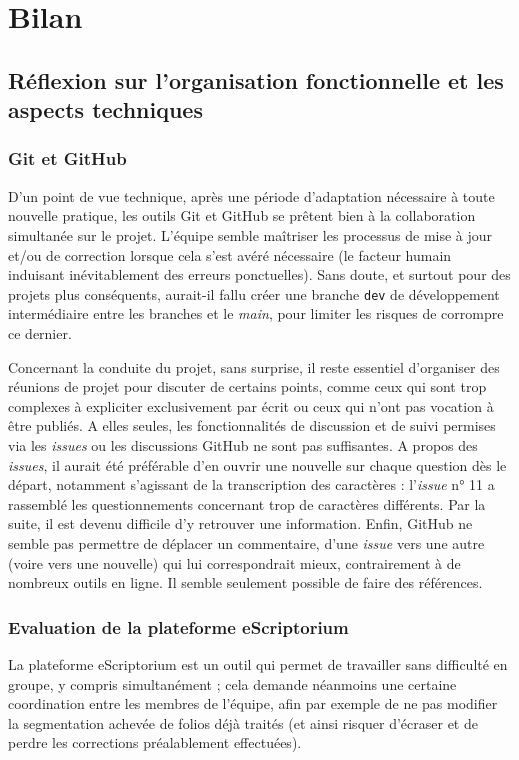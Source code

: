 \documentclass{article}
\begin{document}
\section{Bilan}

\subsection{Réflexion sur l'organisation fonctionnelle et les aspects techniques}
\subsubsection{Git et GitHub}
D'un point de vue technique, après une période d'adaptation nécessaire à toute nouvelle pratique, les outils Git et GitHub se prêtent bien à la collaboration simultanée sur le projet. L'équipe semble maîtriser les processus de mise à jour et/ou de correction lorsque cela s'est avéré nécessaire (le facteur humain induisant inévitablement des erreurs ponctuelles). Sans doute, et surtout pour des projets plus conséquents, aurait-il fallu créer une branche \texttt{dev} de développement intermédiaire entre les branches et le  \textit{main}, pour limiter les risques de corrompre ce dernier.


Concernant la conduite du projet, sans surprise, il reste essentiel d'organiser des réunions de projet pour discuter de certains points, comme ceux qui sont trop complexes à expliciter exclusivement par écrit ou ceux qui n'ont pas vocation à être publiés. A elles seules, les fonctionnalités de discussion et de suivi permises via les \textit{issues} ou les discussions GitHub ne sont pas suffisantes.
A propos des \textit{issues}, il aurait été préférable d'en ouvrir une nouvelle sur chaque question dès le départ, notamment s'agissant de la transcription des caractères : l'\textit{issue} n° 11 a rassemblé les questionnements concernant trop de caractères différents. Par la suite, il est devenu difficile d'y retrouver une information. Enfin, GitHub ne semble pas permettre de déplacer un commentaire, d'une \textit{issue} vers une autre (voire vers une nouvelle) qui lui correspondrait mieux, contrairement à de nombreux outils en ligne. Il semble seulement possible de faire des références.


\subsubsection{Evaluation de la plateforme eScriptorium}

La plateforme eScriptorium est un outil qui permet de travailler sans difficulté en groupe, y compris simultanément ; cela demande néanmoins une certaine coordination entre les membres de l'équipe, afin par exemple de ne pas modifier la segmentation achevée de folios déjà traités (et ainsi risquer d'écraser et de perdre les corrections préalablement effectuées).
\end{document}
